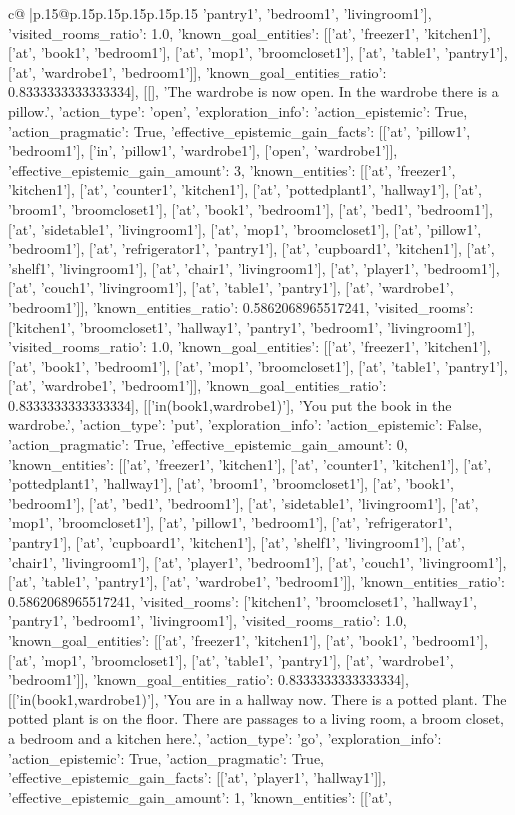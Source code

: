 \documentclass{article}
\begin{document}
{\begin{supertabular}{c@{$\;$}|p{.15\linewidth}@{}p{.15\linewidth}p{.15\linewidth}p{.15\linewidth}p{.15\linewidth}p{.15\linewidth}}
{{{'pantry1', 'bedroom1', 'livingroom1'], 'visited_rooms_ratio': 1.0, 'known_goal_entities': [['at', 'freezer1', 'kitchen1'], ['at', 'book1', 'bedroom1'], ['at', 'mop1', 'broomcloset1'], ['at', 'table1', 'pantry1'], ['at', 'wardrobe1', 'bedroom1']], 'known_goal_entities_ratio': 0.8333333333333334}}], [[], 'The wardrobe is now open. In the wardrobe there is a pillow.', {'action_type': 'open', 'exploration_info': {'action_epistemic': True, 'action_pragmatic': True, 'effective_epistemic_gain_facts': [['at', 'pillow1', 'bedroom1'], ['in', 'pillow1', 'wardrobe1'], ['open', 'wardrobe1']], 'effective_epistemic_gain_amount': 3, 'known_entities': [['at', 'freezer1', 'kitchen1'], ['at', 'counter1', 'kitchen1'], ['at', 'pottedplant1', 'hallway1'], ['at', 'broom1', 'broomcloset1'], ['at', 'book1', 'bedroom1'], ['at', 'bed1', 'bedroom1'], ['at', 'sidetable1', 'livingroom1'], ['at', 'mop1', 'broomcloset1'], ['at', 'pillow1', 'bedroom1'], ['at', 'refrigerator1', 'pantry1'], ['at', 'cupboard1', 'kitchen1'], ['at', 'shelf1', 'livingroom1'], ['at', 'chair1', 'livingroom1'], ['at', 'player1', 'bedroom1'], ['at', 'couch1', 'livingroom1'], ['at', 'table1', 'pantry1'], ['at', 'wardrobe1', 'bedroom1']], 'known_entities_ratio': 0.5862068965517241, 'visited_rooms': ['kitchen1', 'broomcloset1', 'hallway1', 'pantry1', 'bedroom1', 'livingroom1'], 'visited_rooms_ratio': 1.0, 'known_goal_entities': [['at', 'freezer1', 'kitchen1'], ['at', 'book1', 'bedroom1'], ['at', 'mop1', 'broomcloset1'], ['at', 'table1', 'pantry1'], ['at', 'wardrobe1', 'bedroom1']], 'known_goal_entities_ratio': 0.8333333333333334}}], [['in(book1,wardrobe1)'], 'You put the book in the wardrobe.', {'action_type': 'put', 'exploration_info': {'action_epistemic': False, 'action_pragmatic': True, 'effective_epistemic_gain_amount': 0, 'known_entities': [['at', 'freezer1', 'kitchen1'], ['at', 'counter1', 'kitchen1'], ['at', 'pottedplant1', 'hallway1'], ['at', 'broom1', 'broomcloset1'], ['at', 'book1', 'bedroom1'], ['at', 'bed1', 'bedroom1'], ['at', 'sidetable1', 'livingroom1'], ['at', 'mop1', 'broomcloset1'], ['at', 'pillow1', 'bedroom1'], ['at', 'refrigerator1', 'pantry1'], ['at', 'cupboard1', 'kitchen1'], ['at', 'shelf1', 'livingroom1'], ['at', 'chair1', 'livingroom1'], ['at', 'player1', 'bedroom1'], ['at', 'couch1', 'livingroom1'], ['at', 'table1', 'pantry1'], ['at', 'wardrobe1', 'bedroom1']], 'known_entities_ratio': 0.5862068965517241, 'visited_rooms': ['kitchen1', 'broomcloset1', 'hallway1', 'pantry1', 'bedroom1', 'livingroom1'], 'visited_rooms_ratio': 1.0, 'known_goal_entities': [['at', 'freezer1', 'kitchen1'], ['at', 'book1', 'bedroom1'], ['at', 'mop1', 'broomcloset1'], ['at', 'table1', 'pantry1'], ['at', 'wardrobe1', 'bedroom1']], 'known_goal_entities_ratio': 0.8333333333333334}}], [['in(book1,wardrobe1)'], 'You are in a hallway now. There is a potted plant. The potted plant is on the floor. There are passages to a living room, a broom closet, a bedroom and a kitchen here.', {'action_type': 'go', 'exploration_info': {'action_epistemic': True, 'action_pragmatic': True, 'effective_epistemic_gain_facts': [['at', 'player1', 'hallway1']], 'effective_epistemic_gain_amount': 1, 'known_entities': [['at', }}}
\end{supertabular}}
\end{document}
